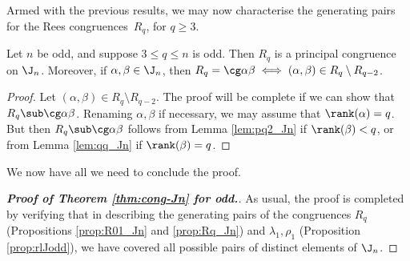 Armed with the previous results, we may now characterise the generating pairs for the Rees congruences~$R_q$, for $q\geq3$.




\begin{proposition}\label{prop:Rq_Jn}
Let $n$ be odd, and suppose $3\leq q\leq n$ is odd.  Then $R_q$ is a principal congruence on $\J_n$.  Moreover, if $\alpha,\beta\in\J_n$, then $R_q=\cg\alpha\beta\iff(\alpha,\beta)\in R_q\setminus R_{q-2}$.
\end{proposition}

\begin{proof} Let $(\alpha,\beta)\in R_q\setminus R_{q-2}$.  The proof will be complete if we can show that $R_q\sub\cg\alpha\beta$.  Renaming $\alpha,\beta$ if necessary, we may assume that $\rank(\alpha)=q$.  But then $R_q\sub\cg\alpha\beta$ follows from Lemma \ref{lem:pq2_Jn} if $\rank(\beta)<q$, or from Lemma \ref{lem:qq_Jn} if $\rank(\beta)=q$. \end{proof}

We now have all we need to conclude the proof.

\begin{proof}[{\bf Proof of Theorem \ref{thm:cong-Jn} for  odd.}]
As usual, the proof is completed by verifying that in describing the generating pairs of the congruences $R_q$
(Propositions \ref{prop:R01_Jn} and \ref{prop:Rq_Jn}) and $\lambda_1,\rho_1$
(Proposition \ref{prop:rlJodd}), we have covered all possible pairs of distinct elements of $\J_n$.
\end{proof}
